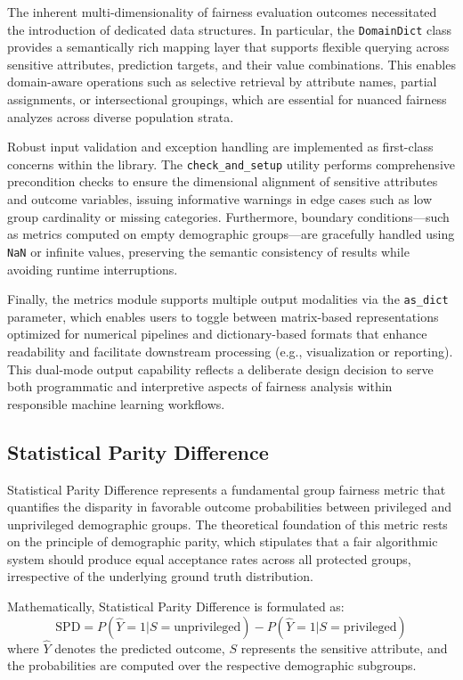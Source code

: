 \documentclass[12pt,a4paper,openright,twoside]{book}
\begin{document}
The inherent multi-dimensionality of fairness evaluation outcomes necessitated the introduction of dedicated data structures. In particular, the \texttt{DomainDict} class provides a semantically rich mapping layer that supports flexible querying across sensitive attributes, prediction targets, and their value combinations. This enables domain-aware operations such as selective retrieval by attribute names, partial assignments, or intersectional groupings, which are essential for nuanced fairness analyzes across diverse population strata.

Robust input validation and exception handling are implemented as first-class concerns within the library. The \texttt{check\_and\_setup} utility performs comprehensive precondition checks to ensure the dimensional alignment of sensitive attributes and outcome variables, issuing informative warnings in edge cases such as low group cardinality or missing categories. Furthermore, boundary conditions—such as metrics computed on empty demographic groups—are gracefully handled using \texttt{NaN} or infinite values, preserving the semantic consistency of results while avoiding runtime interruptions.

Finally, the metrics module supports multiple output modalities via the \texttt{as\_dict} parameter, which enables users to toggle between matrix-based representations optimized for numerical pipelines and dictionary-based formats that enhance readability and facilitate downstream processing (e.g., visualization or reporting). This dual-mode output capability reflects a deliberate design decision to serve both programmatic and interpretive aspects of fairness analysis within responsible machine learning workflows.


\subsection{Statistical Parity Difference}

Statistical Parity Difference represents a fundamental group fairness metric that quantifies the disparity in favorable outcome probabilities between privileged and unprivileged demographic groups. The theoretical foundation of this metric rests on the principle of demographic parity, which stipulates that a fair algorithmic system should produce equal acceptance rates across all protected groups, irrespective of the underlying ground truth distribution.

Mathematically, Statistical Parity Difference is formulated as:
\begin{equation}
\text{SPD} = P(\hat{Y}=1|S=\text{unprivileged}) - P(\hat{Y}=1|S=\text{privileged})
\end{equation}
where $\hat{Y}$ denotes the predicted outcome, $S$ represents the sensitive attribute, and the probabilities are computed over the respective demographic subgroups.
\end{document}

